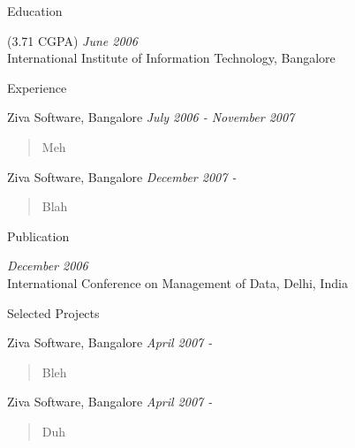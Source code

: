 \documentclass{resume}
\author{Siddhartha Reddy Kothakapu}
\begin{document}
\maketitle

\newcommand{\period}{\hfill\small\em}

\begin{category}{Education}

     {\footnotesize(3.71 CGPA)} {\period June 2006}\\
	International Institute of Information Technology, Bangalore

\end{category}


\begin{category}{Experience}

     Ziva Software, Bangalore {\period July 2006 - November 2007}
    \begin{quote}
        Meh
    \end{quote}

     Ziva Software, Bangalore {\period December 2007 - }
    \begin{quote}
        Blah
    \end{quote}

\end{category}


\begin{category}{Publication}

     {\period December 2006}\\
    International Conference on Management of Data, Delhi, India

\end{category}


\begin{category}{Selected Projects}

     Ziva Software, Bangalore {\period April 2007 - }
 	\begin{quote}
        Bleh
	\end{quote}

     Ziva Software, Bangalore {\period April 2007 - }
 	\begin{quote}
        Duh
	\end{quote}

\end{category}
\end{document}
